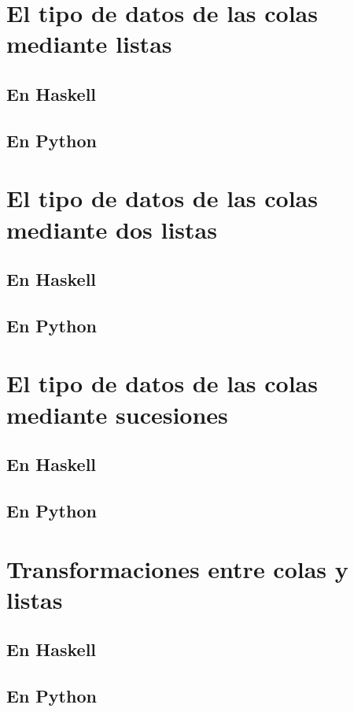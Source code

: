 \documentclass[a4paper,12pt,twoside]{book}
\begin{document}
\section{El tipo de datos de las colas mediante listas}
\subsection{En Haskell}
\subsection{En Python}

\section{El tipo de datos de las colas mediante dos listas}
\subsection{En Haskell}
\subsection{En Python}

\section{El tipo de datos de las colas mediante sucesiones}
\subsection{En Haskell}
\subsection{En Python}

\section{Transformaciones entre colas y listas}
\subsection{En Haskell}
\subsection{En Python}
\end{document}
